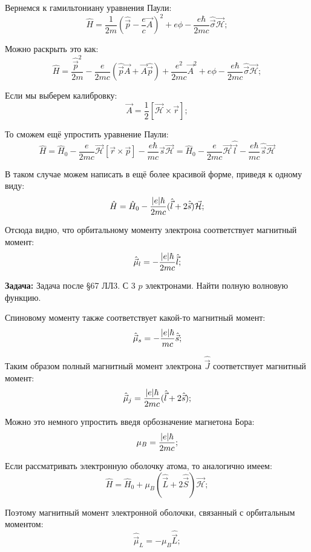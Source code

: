 \documentclass[a4paper, 14pt, russian]{article}
\newcommand{\be}{\begin{equation}}
\newcommand{\ee}{\end{equation}}
\begin{document}
	Вернемся к гамильтониану уравнения Паули:
	\be
		\hat H = \frac{1}{2m} (\hat{\vec p} - \frac{e}{c} \vec A)^2 + e\phi - 
			\frac{e\hbar}{2mc} \hat{\vec \sigma} \vec{\mathcal H};
	\ee

	Можно раскрыть это как:
	\be
		\hat H = \frac{\hat{\vec p}^2}{2m}  - \frac{e}{2mc} (\hat{\vec p} \vec A +
			\vec A \hat{\vec p}) + \frac{e^2}{2mc} \vec{A}^2  + e\phi - 
			\frac{e\hbar}{2mc} \hat{\vec \sigma} \vec{\mathcal H};
	\ee

	Если мы выберем калибровку:
	\be
		\vec A = \frac{1}{2} [\vec{\mathcal H} \times \vec r];
	\ee

	То сможем ещё упростить уравнение Паули:
	\be
		\hat H = \hat{H}_0 - \frac{e}{2mc} \vec{\mathcal H} [\vec r \times \vec p]
			-\frac{e\hbar}{mc} \hat{\vec s} \vec{\mathcal H} = \hat{H}_0
			 -  \frac{e}{2mc} \vec{\mathcal H} \hat{\vec l} - \frac{e\hbar}{mc} 
			 \hat{\vec s} \vec{\mathcal H}
	 \ee
	 
	 В таком случае можем написать в ещё более красивой форме, приведя к одному виду:
	 \be
		 \hat H = \hat{H}_0 - \frac{\abs{e} \hbar}{2mc} (\hat{\vec l} +2 \hat{\vec s})
		 \vec{\mathcal H};
	 \ee

	 Отсюда видно, что орбитальному моменту электрона соответствует магнитный момент:
	 \be
	 	\hat{\vec{\mu}}_l = - \frac{\abs{e}\hbar}{2mc}\hat{\vec l};
	 \ee

	\begin{tcolorbox}
		\textbf{Задача:} Задача после \S 67  ЛЛ3. С 3 $p$ электронами.
		Найти полную волновую функцию.
	\end{tcolorbox}


	Спиновому моменту также соответствует какой-то магнитный момент:
	\be
		\hat{\vec{\mu}}_s = - \frac{\abs{e}\hbar}{mc} \hat{\vec s};
	\ee

	Таким образом полный магнитный момент электрона $\hat{\vec J}$ 
	соответствует магнитный момент:
	\be
		\hat{\vec \mu}_j = \frac{\abs{e} \hbar}{2mc} (\hat{\vec l} +2 \hat{\vec s});
	\ee

	Можно это немного упростить введя орбозначение магнетона Бора:
	\be
		\mu_B = \frac{\abs{e}\hbar}{2mc};
	\ee

	Если рассматривать электронную оболочку атома, то аналогично имеем:
	\be
		\hat H = \hat{H}_0 + \mu_B(\hat{\vec L}+2\hat{\vec S}) \vec{\mathcal H};
	\ee

	Поэтому магнитный момент электронной оболочки, связанный с орбитальным
	моментом:
	\be
		\hat{\vec \mu}_L = -\mu_B \hat{\vec L};
	\ee
\end{document}
